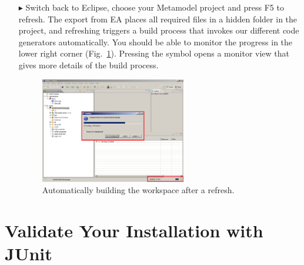 \begin{enumerate}
\newpage

\item[$\blacktriangleright$] Switch back to Eclipse, choose your Metamodel
project and press F5 to refresh.
The export from EA places all required files in a hidden folder in the
project, and refreshing triggers a build process that invokes our different
code generators automatically.
You should be able to monitor the progress in the lower right corner
(Fig.~\ref{fig_eclipsebuilding}).  
Pressing the symbol opens a monitor view that gives more details of the build
process. 
\begin{figure}[!h]
	\centering
  \includegraphics[width=0.6\textwidth]{pics/eclipse_building.png}
	\caption{Automatically building the workspace after a refresh.}
	\label{fig_eclipsebuilding}
\end{figure}
\end{enumerate}

\section{Validate Your Installation with JUnit}

